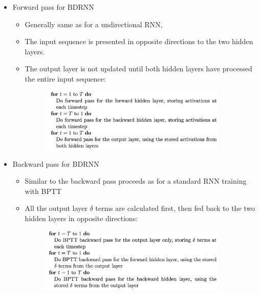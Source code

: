 \documentclass{beamer}
\begin{document}
{
    \begin{itemize}
        \item Forward pass for BDRNN 
            \begin{itemize} 
                \item Generally same as for a undirectional RNN, 
                \item The input sequence is presented in opposite directions to the two hidden layers. 
                \item The output layer is not updated until both hidden layers have processed the entire input sequence:
	            \begin{figure}[ht]  
	            	\begin{center}
	            		\includegraphics[width=3.5in]{Images/BDRNN_forward_pass.png}   
	            	\end{center}   
	            \end{figure}
            \end{itemize}
    \end{itemize}
}
\frame
{
    \begin{itemize}
        \item Backward pass for BDRNN 
            \begin{itemize} 
                \item Similar to the backward pass proceeds as for a standard RNN training with BPTT  
                \item All the output layer $ \delta $ terms are calculated first, 
                    then fed back to the two hidden layers in opposite directions:
	            \begin{figure}[ht]  
	            	\begin{center}
	            		\includegraphics[width=3.5in]{Images/BDRNN_backward_pass.png}   
	            	\end{center}   
	            \end{figure}
            \end{itemize}
    \end{itemize}
}
\end{document}
